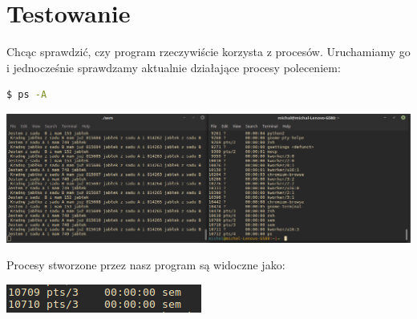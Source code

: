 \documentclass[10pt,a4paper]{article}
\begin{document}
\section{Testowanie}
Chcąc sprawdzić, czy program rzeczywiście korzysta z procesów. Uruchamiamy go i jednocześnie sprawdzamy aktualnie działające procesy poleceniem:
\begin{lstlisting}[language=bash,caption=Polecenie wyświetlające działające procesy]
  $ ps -A
\end{lstlisting}
\begin{center}
  \includegraphics[width=\textwidth]{so1}
\end{center}
Procesy stworzone przez nasz program są widoczne jako:
\begin{center}
  \includegraphics[]{so2}
\end{center}
\end{document}
